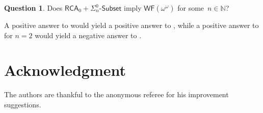 \documentclass{article}
\def\NN{\mathbb{N}}
\newcommand{\WF}{\mathsf{WF}}
\newcommand{\Sub}[1]{{#1}\mbox{-}\mathsf{Subset}}
\newcommand{\RCA}{\mathsf{RCA}}
\numberwithin{theorem}{section}
\theoremstyle{definition}
\newtheorem{question}[theorem]{Question}
\begin{document}
\begin{question}\label{quest:sigman-imply-wfomegaomega}
Does $\RCA_0 + \Sub{\Sigma^0_n}$ imply $\WF(\omega^\omega)$ for some~$n \in \NN$?
\end{question}

A positive answer to  would yield a positive answer to , while a positive answer to  for $n = 2$ would yield a negative answer to .


\section*{Acknowledgment}

The authors are thankful to the anonymous referee for his improvement suggestions.



\end{document}
